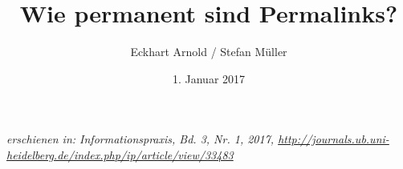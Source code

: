 \documentclass[12pt, a4paper]{article}
\begin{document}
 

\title{Wie permanent sind Permalinks?}

\author{Eckhart Arnold / Stefan Müller}

\date{1. Januar 2017}

\maketitle

\sloppy

\begin{center}
{\em erschienen in: Informationspraxis, Bd. 3, Nr. 1, 2017, \href{http://journals.ub.uni-heidelberg.de/index.php/ip/article/view/33483}{http://journals.ub.uni-heidelberg.de/index.php/ip/article/view/33483}}
\end{center}
\end{document}
